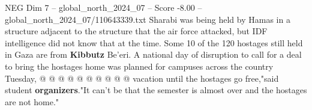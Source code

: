 \begin{textsample}{NEG Dim 7 – global\_north\_2024\_07 – Score -8.00 – global\_north\_2024\_07/110643339.txt}
Sharabi was being held by Hamas in a structure adjacent to the structure that the air force attacked, but IDF intelligence did not know that at the time.
Some 10 of the 120 hostages still held in Gaza are from \textbf{Kibbutz} Be'eri.
A national day of disruption to call for a deal to bring the hostages home was planned for campuses across the country Tuesday, @ @ @ @ @ @ @ @ @ @ vacation until the hostages go free,"said student \textbf{organizers}."It can't be that the semester is almost over and the hostages are not home."

\end{textsample}
